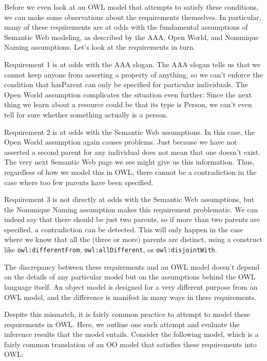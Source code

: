 Before we even look at an OWL model that attempts to satisfy these
conditions, we can make some observations about the requirements
themselves. In particular, many of these requirements are at odds with
the fundamental assumptions of Semantic Web modeling, as described by
the AAA, Open World, and Nonunique Naming assumptions. Let's look at the
requirements in turn.

Requirement 1 is at odds with the AAA slogan. The AAA slogan tells us
that we cannot keep anyone from asserting a property of anything, so we
can't enforce the condition that hasParent can only be specified for
particular individuals. The Open World assumption complicates the
situation even further: Since the next thing we learn about a resource
could be that its type is Person, we can't even tell for sure whether
something actually is a person.

Requirement 2 is at odds with the Semantic Web assumptions. In this
case, the Open World assumption again causes problems. Just because we
have not asserted a second parent for any individual does not mean that
one doesn't exist. The very next Semantic Web page we see might give us
this information. Thus, regardless of how we model this in OWL, there
cannot be a contradiction in the case where too few parents have been
specified.

Requirement 3 is not directly at odds with the Semantic Web assumptions,
but the Nonunique Naming assumption makes this requirement problematic.
We can indeed say that there should be just two parents, so if more than
two parents are specified, a contradiction can be detected. This will
only happen in the case where we know that all the (three or more)
parents are distinct, using a construct like \texttt{owl:differentFrom},
\texttt{owl:allDifferent}, or \texttt{owl:disjointWith}.

The discrepancy between these requirements and an OWL model doesn't
depend on the details of
any particular model but on the assumptions behind the OWL language
itself. An object model is designed for a very different purpose from an
OWL model, and the difference is manifest in many ways in these
requirements.

Despite this mismatch, it is fairly common practice to attempt to model
these requirements in OWL. Here, we outline one such attempt and
evaluate the inference results that the model entails. Consider the
following model, which is a fairly common translation of an OO model
that satisfies these requirements into OWL:

